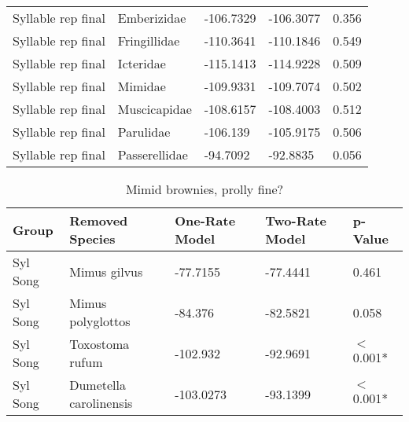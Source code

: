 \documentclass{article}\usepackage[]{graphicx}\usepackage[]{color}
\begin{document}
\begin{table}[ht]
\begin{tabular}{lllll}
  Syllable rep final & Emberizidae & -106.7329 & -106.3077 & 0.356 \\ 
  Syllable rep final & Fringillidae & -110.3641 & -110.1846 & 0.549 \\ 
  Syllable rep final & Icteridae & -115.1413 & -114.9228 & 0.509 \\ 
  Syllable rep final & Mimidae & -109.9331 & -109.7074 & 0.502 \\ 
  Syllable rep final & Muscicapidae & -108.6157 & -108.4003 & 0.512 \\ 
  Syllable rep final & Parulidae & -106.139 & -105.9175 & 0.506 \\ 
  Syllable rep final & Passerellidae & -94.7092 & -92.8835 & 0.056 \\ 
   \hline
\end{tabular}
\end{table}

\begin{table}[ht]
\centering
\caption{Mimid brownies, prolly fine?}
\begin{tabular}{lllll}
  \hline
Group & Removed Species & One-Rate Model & Two-Rate Model & p-Value \\ 
  \hline
Syl Song & Mimus gilvus & -77.7155 & -77.4441 & 0.461 \\ 
  Syl Song & Mimus polyglottos & -84.376 & -82.5821 & 0.058 \\ 
  Syl Song & Toxostoma rufum & -102.932 & -92.9691 & $<$0.001* \\ 
  Syl Song & Dumetella carolinensis & -103.0273 & -93.1399 & $<$0.001* \\ 
   \hline
\end{tabular}
\end{table}
\end{document}
